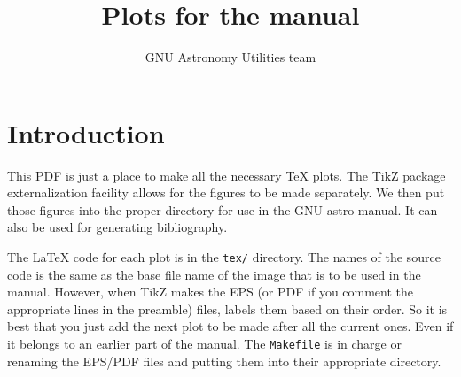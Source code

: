 \documentclass[a4paper]{article}
\author{GNU Astronomy Utilities team}
\title{Plots for the manual}
\begin{document}
\maketitle

\section{Introduction}\label{intro}

This PDF is just a place to make all the necessary \TeX{} plots. The
TikZ package externalization facility allows for the figures to be
made separately. We then put those figures into the proper directory
for use in the GNU astro manual. It can also be used for generating
bibliography.

The \LaTeX{} code for each plot is in the \texttt{tex/} directory. The
names of the source code is the same as the base file name of the
image that is to be used in the manual. However, when TikZ makes the
EPS (or PDF if you comment the appropriate lines in the preamble)
files, labels them based on their order. So it is best that you just
add the next plot to be made after all the current ones. Even if it
belongs to an earlier part of the manual. The \texttt{Makefile} is in
charge or renaming the EPS/PDF files and putting them into their
appropriate directory.








\end{document}
